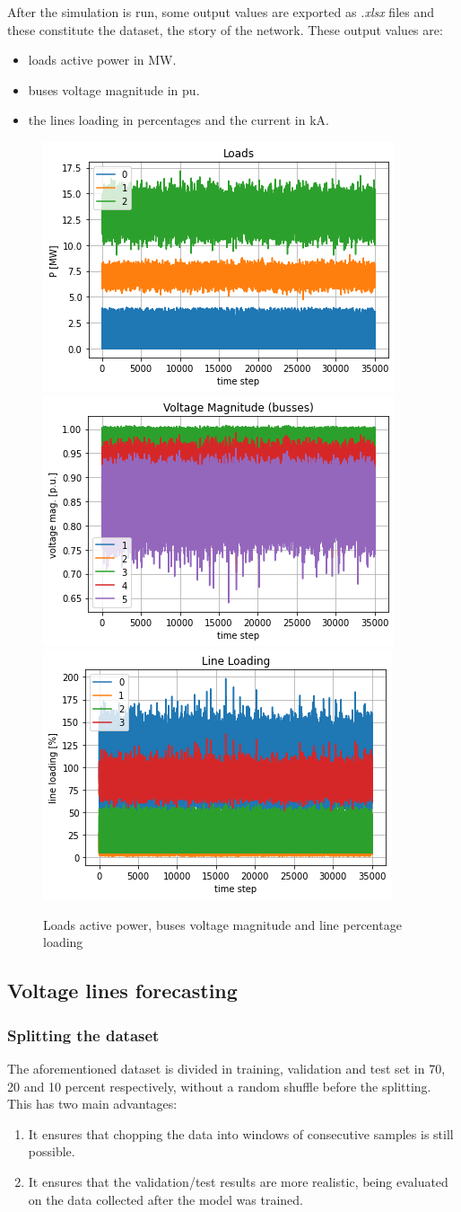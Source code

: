 After the simulation is run, some output values are exported as \emph{.xlsx} files and these constitute the dataset, the story of the network. These output values are:
\begin{itemize}
    \item loads active power in MW.
    \item buses voltage magnitude in \gls{pu}.
    \item the lines loading in percentages and the current in kA.
\end{itemize}

\begin{figure}[h]
    \centering
    \includegraphics[width=.32\linewidth]{images/GYM-ANM/DATASET PLOTS/loads.png}
    \includegraphics[width=.32\linewidth]{images/GYM-ANM/DATASET PLOTS/VM.png}
    \includegraphics[width=.32\linewidth]{images/GYM-ANM/DATASET PLOTS/LL.png}
    \caption[GYM-ANM datasets]{Loads active power, buses voltage magnitude and line percentage loading}
    \label{fig:net_sit3}
\end{figure}
    
    
\subsection{Voltage lines forecasting}
\subsubsection{Splitting the dataset}
The aforementioned dataset is divided in training, validation and test set in 70, 20 and 10 percent respectively, without a random shuffle before the splitting. This has two main advantages:
\begin{enumerate}
    \item It ensures that chopping the data into windows of consecutive samples is still possible.
    \item It ensures that the validation/test results are more realistic, being evaluated on the data collected after the model was trained.
\end{enumerate}

